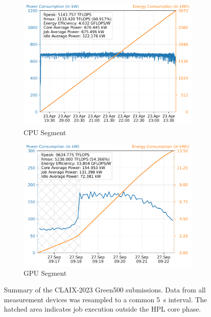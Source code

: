 \begin{figure}[htbp]
    \centering
    \hfill
    \begin{subfigure}{0.45\textwidth}
        \centering
        \includegraphics[width=\textwidth]{data/example-rwth-claix-2023/cpu/summary.pdf}
        \caption{CPU Segment}
        \label{fig:example-rwth-claix-2023-cpu-summary}
    \end{subfigure}
    \hfill
    \begin{subfigure}{0.45\textwidth}
        \centering
        \includegraphics[width=\textwidth]{data/example-rwth-claix-2023/gpu/summary.pdf}
        \caption{GPU Segment}
        \label{fig:example-rwth-claix-2023-gpu-summary}
    \end{subfigure}
    \hfill
    \caption{Summary of the CLAIX-2023 Green500 submissions. Data from all measurement devices was resampled to a common \SI{5}{\second} interval. The hatched area indicates job execution outside the \acs{HPL} core phase.}
    \label{fig:example-rwth-claix-2023-summary}
\end{figure}
